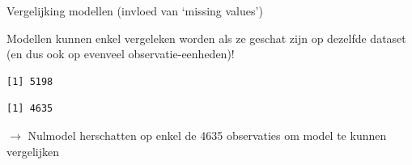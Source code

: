 \documentclass[
  10pt,
  ignorenonframetext,
]{beamer}
\newenvironment{Shaded}{\begin{snugshade}}{\end{snugshade}}
\newcommand{\KeywordTok}[1]{\textcolor[rgb]{0.13,0.29,0.53}{\textbf{#1}}}
\newcommand{\NormalTok}[1]{#1}
\newcommand{\OperatorTok}[1]{\textcolor[rgb]{0.81,0.36,0.00}{\textbf{#1}}}
\begin{document}
\begin{frame}[fragile]{Vergelijking modellen (invloed van `missing
values')}
\protect\hypertarget{vergelijking-modellen-invloed-van-missing-values}{}

Modellen kunnen enkel vergeleken worden als ze geschat zijn op dezelfde
dataset (en dus ook op evenveel observatie-eenheden)!

\begin{Shaded}
\end{Shaded}

\begin{verbatim}
[1] 5198
\end{verbatim}

\begin{Shaded}
\end{Shaded}

\begin{verbatim}
[1] 4635
\end{verbatim}

\(\rightarrow\) Nulmodel herschatten op enkel de 4635 observaties om
model te kunnen vergelijken

\end{frame}
\end{document}
